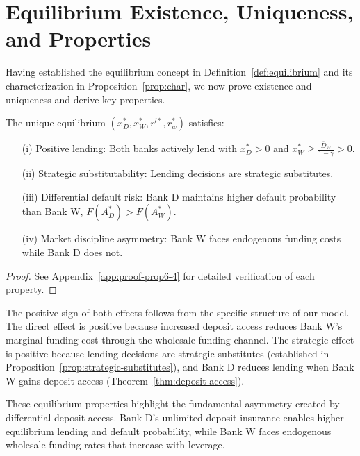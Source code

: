 \documentclass[12pt]{article}
\begin{document}
\section{Equilibrium Existence, Uniqueness, and Properties}
Having established the equilibrium concept in Definition~\ref{def:equilibrium} and its characterization in Proposition~\ref{prop:char}, we now prove existence and uniqueness and derive key properties.



\begin{proposition}\label{prop:strategic-substitutes}
The unique equilibrium $(x_{D}^{*}, x_{W}^{*}, r^{l*}, r_{w}^{*})$ satisfies:
\begin{enumerate}
    \item[(i)] Positive lending: Both banks actively lend with $x_{D}^{*} > 0$ and $x_{W}^{*} \ge \frac{\overline{D}_{W}}{1-\gamma} > 0$.
    \item[(ii)] Strategic substitutability: Lending decisions are strategic substitutes.
    \item[(iii)] Differential default risk: Bank D maintains higher default probability than Bank W, $F(A_D^*) > F(A_W^*)$.
    \item[(iv)] Market discipline asymmetry: Bank W faces endogenous funding costs while Bank D does not.
\end{enumerate}
\end{proposition}

\begin{proof}
See Appendix~\ref{app:proof-prop6-4} for detailed verification of each property.
\end{proof}

\begin{remark}
The positive sign of both effects follows from the specific structure of our model. The direct effect is positive because increased deposit access reduces Bank W's marginal funding cost through the wholesale funding channel. The strategic effect is positive because lending decisions are strategic substitutes (established in Proposition~\ref{prop:strategic-substitutes}), and Bank D reduces lending when Bank W gains deposit access (Theorem~\ref{thm:deposit-access}).
\end{remark}

These equilibrium properties highlight the fundamental asymmetry created by differential deposit access. Bank D's unlimited deposit insurance enables higher equilibrium lending and default probability, while Bank W faces endogenous wholesale funding rates that increase with leverage.
\end{document}
